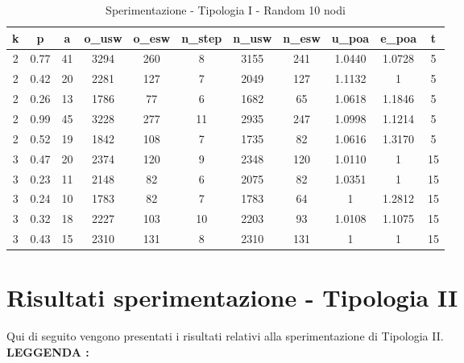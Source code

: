\begin{table}[H]
\centering
\scalebox{0.9} {
\begin{tabular}{|c|c|c|c|c|c|c|c|c|c|c|}
\hline
\textbf{k} & \textbf{p} & \textbf{a} & \textbf{o\_usw} & \textbf{o\_esw} & \textbf{n\_step} & \textbf{n\_usw} & \textbf{n\_esw} & \textbf{u\_poa} & \textbf{e\_poa} & \textbf{t} \\ \hline
2 & 0.77 & 41 & 3294 & 260 & 8 & 3155 & 241 & 1.0440 & 1.0728 & 5 \\ \hline
2 & 0.42 & 20 & 2281 & 127 & 7 & 2049 & 127 & 1.1132 & 1 & 5 \\ \hline
2 & 0.26 & 13 & 1786 & 77 & 6 & 1682 & 65 & 1.0618 & 1.1846 & 5 \\ \hline
2 & 0.99 & 45 & 3228 & 277 & 11 & 2935 & 247 & 1.0998 & 1.1214 & 5 \\ \hline
2 & 0.52 & 19 & 1842 & 108 & 7 & 1735 & 82 & 1.0616 & 1.3170 & 5 \\ \hline
3 & 0.47 & 20 & 2374 & 120 & 9 & 2348 & 120 & 1.0110 & 1 & 15 \\ \hline
3 & 0.23 & 11 & 2148 & 82 & 6 & 2075 & 82 & 1.0351 & 1 & 15 \\ \hline
3 & 0.24 & 10 & 1783 & 82 & 7 & 1783 & 64 & 1 & 1.2812 & 15 \\ \hline
3 & 0.32 & 18 & 2227 & 103 & 10 & 2203 & 93 & 1.0108 & 1.1075 & 15 \\ \hline
3 & 0.43 & 15 & 2310 & 131 & 8 & 2310 & 131 & 1 & 1 & 15 \\ \hline
\end{tabular}
}
\caption{Sperimentazione - Tipologia I - Random 10 nodi}
\label{tab:sperimentazione-tipo1-10nodi}
\end{table}

\section{Risultati sperimentazione - Tipologia II}
\justify
Qui di seguito vengono presentati i risultati relativi alla sperimentazione di Tipologia II.\\

\textbf{LEGGENDA : }

